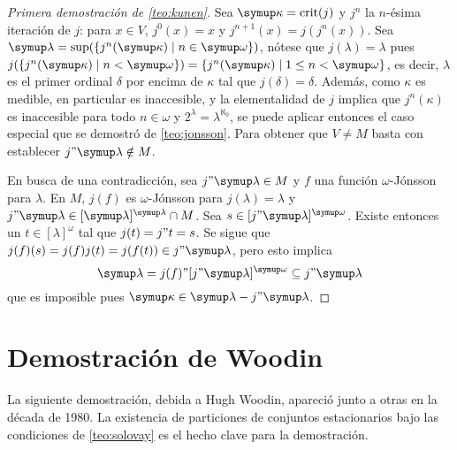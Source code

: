 \documentclass
[
  12pt,
  letterpaper,
  openany,
  oneside,
]{book}
\begin{document}
\begin{proof}[Primera demostración de \ref{teo:kunen}]
    \bgroup\sloppy
    Sea $\kappa=\crit{j}$ y $j^n$ la $n$-ésima iteración de $j$: para $x\in V$, $j^0(x)=x$
    y $j^{n+1}(x) = j(j^{n}(x))$. Sea $\lambda=\sup(\set{j^n(\kappa)\mid n\in\omega})$,
    nótese que $j(\lambda)=\lambda$ pues $j(\set{j^n(\kappa)\mid n<\omega}) = \set{j^n(\kappa)\mid 1\leq n<\omega}$,
    es decir, $\lambda$ es el primer ordinal $\delta$ por encima de $\kappa$ tal que $j(\delta)=\delta$.
    Además, como $\kappa$ es medible, en particular es inaccesible, y la elementalidad de $j$ implica que $j^n(\kappa)$
    es inaccesible para todo $n\in\omega$ y $2^\lambda = \lambda^{\aleph_0}$, se puede aplicar entonces
    el caso especial que se demostró de \ref{teo:jonsson}.
    Para obtener que $V\neq M$ basta con establecer $j"\lambda\notin M$.\par
    \egroup

    En busca de una contradicción, sea $j"\lambda\in M$ y $f$ una función $\omega$-Jónsson para $\lambda$.
    En $M$, $j(f)$ es $\omega$-Jónsson para $j(\lambda)=\lambda$ y $j"\lambda\in[\lambda]^\lambda\cap M$.
    Sea $s\in[j"\lambda]^\omega$. Existe entonces un $t\in[\lambda]^\omega$ tal que $j(t)=j"t=s$.
    Se sigue que $j(f)(s) = j(f)j(t) = j(f(t))\in j"\lambda$, pero esto implica
    \[
        \lambda = j(f)"[j"\lambda]^\omega \subseteq j"\lambda
    \]
    que es imposible pues $\kappa\in\lambda- j"\lambda$.
\end{proof}

\section{Demostración de Woodin}

La siguiente demostración, debida a Hugh Woodin, apareció junto a otras en
la década de 1980. La existencia de particiones de conjuntos estacionarios
bajo las condiciones de \ref{teo:solovay} es el hecho clave para la demostración.
\end{document}
